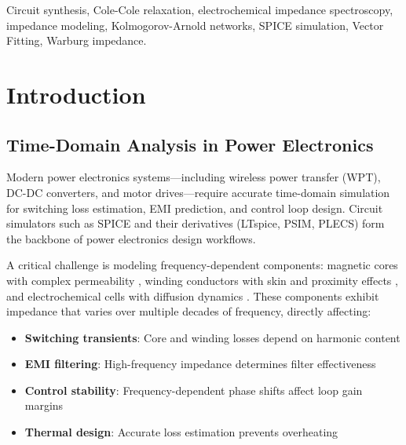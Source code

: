 \documentclass{ieeeaccess}
\begin{document}
\begin{keywords}
Circuit synthesis, Cole-Cole relaxation, electrochemical impedance spectroscopy, impedance modeling, Kolmogorov-Arnold networks, SPICE simulation, Vector Fitting, Warburg impedance.
\end{keywords}

\titlepgskip=-15pt

\maketitle

\section{Introduction}
\label{sec:introduction}

\subsection{Time-Domain Analysis in Power Electronics}

Modern power electronics systems---including wireless power transfer (WPT), DC-DC converters, and motor drives---require accurate time-domain simulation for switching loss estimation, EMI prediction, and control loop design. Circuit simulators such as SPICE \cite{nagel1975spice2} and their derivatives (LTspice, PSIM, PLECS) form the backbone of power electronics design workflows.

A critical challenge is modeling frequency-dependent components: magnetic cores with complex permeability \cite{snelling1988soft}, winding conductors with skin and proximity effects \cite{dowell1966eddy,hurley2000optimizing}, and electrochemical cells with diffusion dynamics \cite{barsoukov2018impedance}. These components exhibit impedance that varies over multiple decades of frequency, directly affecting:
\begin{itemize}
\item \textbf{Switching transients}: Core and winding losses depend on harmonic content
\item \textbf{EMI filtering}: High-frequency impedance determines filter effectiveness
\item \textbf{Control stability}: Frequency-dependent phase shifts affect loop gain margins
\item \textbf{Thermal design}: Accurate loss estimation prevents overheating
\end{itemize}
\end{document}
